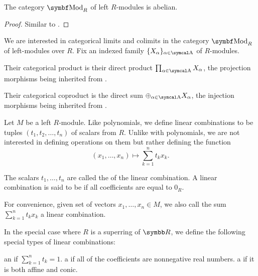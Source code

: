 \begin{proposition}\label{thm:mod_r_is_abelian}
  The category \( \Cat{Mod}_R \) of left \( R \)-modules is abelian.
\end{proposition}
\begin{proof}
  Similar to .
\end{proof}

\begin{proposition}\label{thm:module_categorical_limits}
  We are interested in categorical limits and colimits in the category \( \Cat{Mod}_R \) of left-modules over \( R \). Fix an indexed family  \( \{ X_\al \}_{\al \in \CA} \) of \( R \)-modules.
  \begin{defenum}
     Their categorical product is their direct product \( \prod_{\al \in \CA} X_\al \), the projection morphisms being inherited from .

     Their categorical coproduct is the direct sum \( \oplus_{\al \in \CA} X_\al \), the injection morphisms being inherited from .
  \end{defenum}
\end{proposition}

\begin{definition}\label{def:linear_combination}
  Let \( M \) be a left \( R \)-module. Like polynomials, we define linear combinations to be tuples \( (t_1, t_2, \ldots, t_n) \) of scalars from \( R \). Unlike with polynomials, we are not interested in defining operations on them but rather defining the function
  \begin{equation}\label{def:linear_combination/function}
    (x_1, \ldots, x_n) \mapsto \sum_{k=1}^n t_k x_k.
  \end{equation}

  The scalars \( t_1, \ldots, t_n \) are called the  of the linear combination. A linear combination is said to be  if all coefficients are equal to \( 0_R \).

  For convenience, given set of vectors \( x_1, \ldots, x_n \in M \), we also call the sum \( \sum_{k=1}^n t_k x_k \) a linear combination.

  In the special case where \( R \) is a superring of \( \BR \), we define the following special types of linear combinations:
  \begin{defenum}
     an  if \( \sum_{k=1}^n t_k = 1 \).
     a  if all of the coefficients are nonnegative real numbers.
     a  if it is both affine and conic.
  \end{defenum}
\end{definition}

